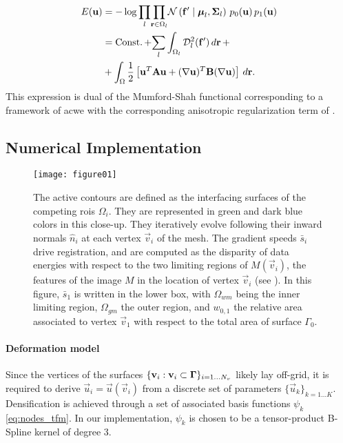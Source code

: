   \begin{align}
  E(\vec{u}) &= -\log \underset{l}{\prod}
  \underset{\vec{r} \in \Omega_l}{\prod}
  \mathcal{N} \left( \vec{f}' \mid \boldsymbol{\mu}_l, \boldsymbol{\Sigma}_l \right)\,p_0( \vec{u})\,p_1( \vec{u}) \notag\\
  &= \const + \underset{l}{\sum} \int_{\Omega_l}
  \mdist{f'}{l} \,d\vec{r} \, + \notag\\
  &+ \int_{\Omega} \frac12 \left[ \vec{u}^T \mathbf{A} \vec{u} + (\nabla \vec{u})^T \mathbf{B} (\nabla \vec{u}) \right] \,d\vec{r}.
  \label{eq:energy}
  \end{align}
%
This expression is dual of the Mumford-Shah functional corresponding
  to a framework of \acrlong*{acwe} \citep{chan_active_2001}
  with the corresponding anisotropic regularization term of \cite{nagel_investigation_1986}.


\subsection{Numerical Implementation}
\label{sec:numerical_implementation}

\begin{figure}
	\texttt{[image: figure01]}
	\caption{The active contours are defined as the interfacing surfaces of the competing
	  \glspl{roi} $\Omega_i$.
	They are represented in green and dark blue colors in this close-up.
	They iteratively evolve following their inward normals $\hat{n}_i$ at each vertex
	  $\vec{v}_i$ of the mesh.
	The gradient speeds $\bar{s}_i$ drive registration, and are computed as the disparity of data
    energies with respect to the two limiting regions of $M(\vec{v}_i)$, the features of the image
    $M$ in the location of vertex $\vec{v}_i$ (see ).
	In this figure, $\bar{s}_1$ is written in the lower
	  box, with $\Omega_{wm}$ being the inner limiting region, $\Omega_{gm}$ the outer region, and
    $w_{0,1}$ the relative area associated to vertex $\vec{v}_1$ with respect to
    the total area of surface $\Gamma_0$.
	}\label{fig:method}
\end{figure}

\paragraph*{Deformation model}\label{sec:deformation_model}
Since the vertices of the surfaces $\{\mathbf{v}_i: \mathbf{v}_i \subset \boldsymbol{\Gamma} \}_{i=1 \ldots N_v}$
  likely lay off-grid, it is required to derive $\vec{u}_i = \vec{u}(\vec{v}_i)$ from a discrete set of parameters
  $\{\vec{u}_k\}_{k=1 \ldots K}$.
Densification is achieved through a set of associated basis functions $\psi_k$ \eqref{eq:nodes_tfm}.
In our implementation, $\psi_k$ is chosen to be a tensor-product B-Spline kernel
  of degree 3.

